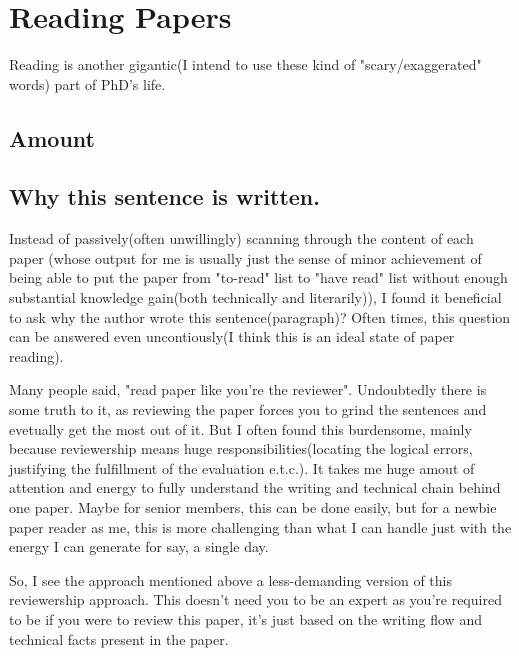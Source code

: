 \section{Reading Papers}
\label{sec:read}
Reading is another gigantic(I intend to use these kind of "scary/exaggerated" words) part of PhD's life.
\subsection{Amount}
\subsection{Why this sentence is written.}
Instead of passively(often unwillingly) scanning through the content of each paper (whose output for me is usually just the 
sense of minor achievement of being able to put the paper from "to-read" list to "have read" list without enough substantial knowledge gain(both technically and literarily)),
I found it beneficial to ask why the author wrote this sentence(paragraph)? 
Often times, this question can be answered even uncontiously(I think this is an ideal state of paper reading).

Many people said, "read paper like you're the reviewer". Undoubtedly there is some truth to it, as reviewing the paper forces you to grind the sentences and 
evetually get the most out of it.
But I often found this burdensome, mainly because reviewership %
means huge responsibilities(locating the logical errors, justifying the fulfillment of the evaluation e.t.c.).
It takes me huge amout of attention and energy to fully understand the writing and technical chain behind one paper.
Maybe for senior members, this can be done easily, but for a newbie paper reader as me, 
this is more challenging than what I can handle just with the energy I can generate for say, a single day.

So, I see the approach mentioned above a less-demanding version of this reviewership approach.
This doesn't need you to be an expert as you're required to be if you were to review this paper,
it's just based on the writing flow and technical facts present in the paper.